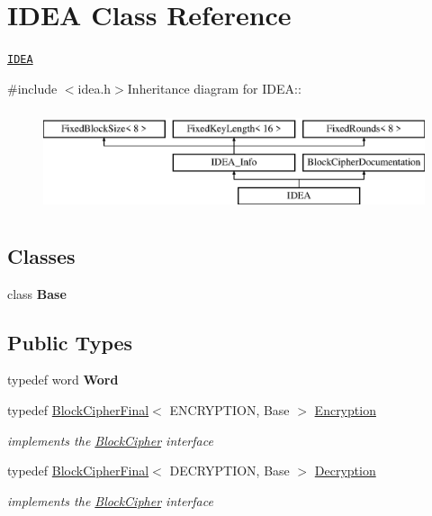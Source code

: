\hypertarget{class_i_d_e_a}{
\section{IDEA Class Reference}
\label{class_i_d_e_a}
}


\href{http://www.weidai.com/scan-mirror/cs.html#IDEA}{\tt IDEA}  


{\ttfamily \#include $<$idea.h$>$}Inheritance diagram for IDEA::\begin{figure}[H]
\begin{center}
\leavevmode
\includegraphics[height=3cm]{class_i_d_e_a}
\end{center}
\end{figure}
\subsection*{Classes}
\begin{DoxyCompactItemize}
\item 
class {\bfseries Base}
\end{DoxyCompactItemize}
\subsection*{Public Types}
\begin{DoxyCompactItemize}
\item 
\hypertarget{class_i_d_e_a_a3ec08f4e29ea15045274d857582b07ab}{
typedef word {\bfseries Word}}
\label{class_i_d_e_a_a3ec08f4e29ea15045274d857582b07ab}

\item 
\hypertarget{class_i_d_e_a_ade540d11b7e9c7b4b7843ada9f62dad2}{
typedef \hyperlink{class_block_cipher_final}{BlockCipherFinal}$<$ ENCRYPTION, Base $>$ \hyperlink{class_i_d_e_a_ade540d11b7e9c7b4b7843ada9f62dad2}{Encryption}}
\label{class_i_d_e_a_ade540d11b7e9c7b4b7843ada9f62dad2}

\begin{DoxyCompactList}\small\item\em implements the \hyperlink{class_block_cipher}{BlockCipher} interface \item\end{DoxyCompactList}\item 
\hypertarget{class_i_d_e_a_abaf8e92663cb16fb255e9acd4ce830d2}{
typedef \hyperlink{class_block_cipher_final}{BlockCipherFinal}$<$ DECRYPTION, Base $>$ \hyperlink{class_i_d_e_a_abaf8e92663cb16fb255e9acd4ce830d2}{Decryption}}
\label{class_i_d_e_a_abaf8e92663cb16fb255e9acd4ce830d2}

\begin{DoxyCompactList}\small\item\em implements the \hyperlink{class_block_cipher}{BlockCipher} interface \item\end{DoxyCompactList}\end{DoxyCompactItemize}



